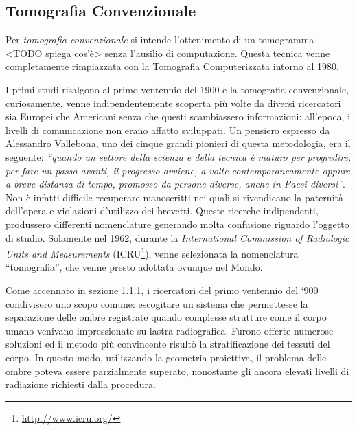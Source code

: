 \documentclass[a4paper,12pt, doubleside]{report}
\begin{document}
            \subsection{Tomografia Convenzionale}
                \par
                    Per \textit{tomografia convenzionale} si intende l'ottenimento di un tomogramma <TODO spiega cos'è> senza l'ausilio di computazione. Questa tecnica venne completamente rimpiazzata con la Tomografia Computerizzata intorno al 1980.
                            
                \par
                    I primi studi risalgono al primo ventennio del 1900 e la tomografia convenzionale, curiosamente, venne indipendentemente scoperta più volte da diversi ricercatori sia Europei che Americani senza che questi scambiassero informazioni: all'epoca, i livelli di comunicazione non erano affatto sviluppati. Un pensiero espresso da Alessandro Vallebona, uno dei cinque grandi pionieri di questa metodologia, era il seguente: \textit{“quando un settore della scienza e della tecnica è maturo per progredire, per fare un passo avanti, il progresso avviene, a volte contemporaneamente oppure a breve distanza di tempo, promosso da persone diverse, anche in Paesi diversi”}\cite{vallebona-pensiero}.
                    Non è infatti difficile recuperare manoscritti nei quali si rivendicano la paternità dell'opera e violazioni d'utilizzo dei brevetti\cite{vallebona-difesa}. Queste ricerche indipendenti, produssero differenti nomenclature generando molta confusione riguardo l'oggetto di studio. Solamente nel 1962, durante la \textit{International Commission of Radiologic Units and Measurements} (ICRU\footnote{\url{http://www.icru.org/}}), venne selezionata la nomenclatura “tomografia”, che venne presto adottata ovunque nel Mondo.
                            
                \par
                    Come accennato in sezione 1.1.1, i ricercatori del primo ventennio del ‘900 condivisero uno scopo comune: escogitare un sistema che permettesse la separazione delle ombre registrate quando complesse strutture come il corpo umano venivano impressionate su lastra radiografica. Furono offerte numerose soluzioni ed il metodo più convincente risultò la stratificazione dei tessuti del corpo. In questo modo, utilizzando la geometria proiettiva, il problema delle ombre poteva essere parzialmente superato, nonostante gli ancora elevati livelli di radiazione richiesti dalla procedura.
                            
\end{document}
